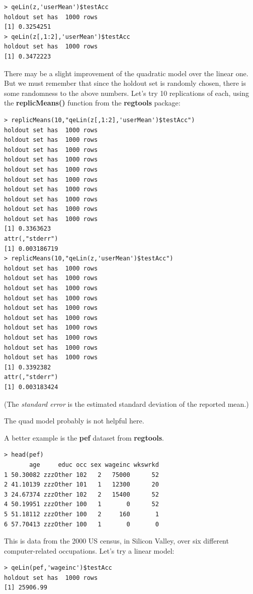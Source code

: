 \begin{lstlisting}
> qeLin(z,'userMean')$testAcc
holdout set has  1000 rows
[1] 0.3254251
> qeLin(z[,1:2],'userMean')$testAcc
holdout set has  1000 rows
[1] 0.3472223
\end{lstlisting}

There may be a slight improvement of the quadratic model over the linear
one.  But we must remember that since the holdout set is randomly
chosen, there is some randomness to the above numbers.  Let's try 10
replications of each, using the \textbf{replicMeans()} function from the
\textbf{regtools} package:

\begin{lstlisting}
> replicMeans(10,"qeLin(z[,1:2],'userMean')$testAcc")
holdout set has  1000 rows
holdout set has  1000 rows
holdout set has  1000 rows
holdout set has  1000 rows
holdout set has  1000 rows
holdout set has  1000 rows
holdout set has  1000 rows
holdout set has  1000 rows
holdout set has  1000 rows
holdout set has  1000 rows
[1] 0.3363623
attr(,"stderr")
[1] 0.003186719
> replicMeans(10,"qeLin(z,'userMean')$testAcc")
holdout set has  1000 rows
holdout set has  1000 rows
holdout set has  1000 rows
holdout set has  1000 rows
holdout set has  1000 rows
holdout set has  1000 rows
holdout set has  1000 rows
holdout set has  1000 rows
holdout set has  1000 rows
holdout set has  1000 rows
[1] 0.3392382
attr(,"stderr")
[1] 0.003183424
\end{lstlisting}

(The \textit{standard error} is the estimated standard deviation of the
reported mean.)

The quad model probably is not helpful here.

A better example is the \textbf{pef} dataset from \textbf{regtools}.

\begin{lstlisting}
> head(pef)
       age     educ occ sex wageinc wkswrkd
1 50.30082 zzzOther 102   2   75000      52
2 41.10139 zzzOther 101   1   12300      20
3 24.67374 zzzOther 102   2   15400      52
4 50.19951 zzzOther 100   1       0      52
5 51.18112 zzzOther 100   2     160       1
6 57.70413 zzzOther 100   1       0       0
\end{lstlisting}

This is data from the 2000 US census, in Silicon Valley, over six
different computer-related occupations.  Let's try a linear model:

\begin{lstlisting}
> qeLin(pef,'wageinc')$testAcc
holdout set has  1000 rows
[1] 25906.99
\end{lstlisting}

